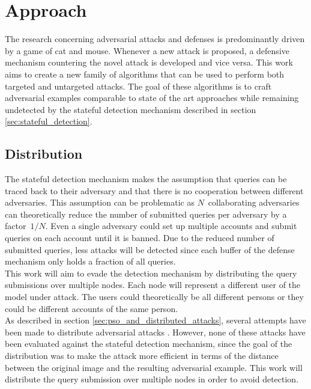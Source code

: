 \chapter{Approach}
The research concerning adversarial attacks and defenses is predominantly driven by a game of cat and mouse. Whenever a new attack is proposed, a defensive mechanism countering the novel attack is developed and vice versa. This work aims to create a new family of algorithms that can be used to perform both targeted and untargeted attacks. The goal of these algorithms is to craft adversarial examples comparable to state of the art approaches while remaining undetected by the stateful detection mechanism \cite{chen_stateful_2019} described in section \ref{sec:stateful_detection}.

\section{Distribution}
The stateful detection mechanism \cite{chen_stateful_2019} makes the assumption that queries can be traced back to their adversary and that there is no cooperation between different adversaries. This assumption can be problematic as $N$~collaborating adversaries can theoretically reduce the number of submitted queries per adversary by a factor~$1/N$. Even a single adversary could set up multiple accounts and submit queries on each account until it is banned. Due to the reduced number of submitted queries, less attacks will be detected since each buffer of the defense mechanism only holds a fraction of all queries.\\

This work will aim to evade the detection mechanism by distributing the query submissions over multiple nodes. Each node will represent a different user of the model under attack. The users could theoretically be all different persons or they could be different accounts of the same person.\\

As described in section \ref{sec:pso_and_distributed_attacks}, several attempts have been made to distribute adversarial attacks \cite{distributed_pso_attack, suryanto2020}. However, none of these attacks have been evaluated against the stateful detection mechanism, since the goal of the distribution was to make the attack more efficient in terms of the distance between the original image and the resulting adversarial example. This work will distribute the query submission over multiple nodes in order to avoid detection.\\

